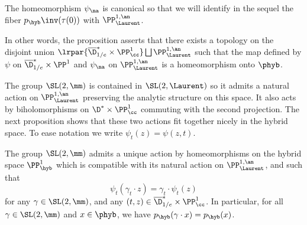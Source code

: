 The homeomorphism $\psi_\na$ is canonical so that we will identify in the sequel the fiber $p_{\hyb}\inv(\tau(0))$ with $\PP^{1,\an}_{\Laurent}$.

\begin{rema}
In other words, the proposition asserts that there exists a topology on the disjoint union $\lrpar{\overline{\D}^*_{1/e} \times \PP^1_\cc } \bigsqcup \PP^{1,\an}_{\Laurent}$ such that the map defined by $\psi$ on $\overline{\D}^*_{1/e} \times \PP^1 $ and $\psi_\na$ on $\PP^{1,\an}_{\Laurent}$ is a homeomorphism onto $\phyb$.
\end{rema}

The group $\SL(2,\mm)$ is contained in $\SL(2,\Laurent)$ so it admits a natural action on $\PP^{1,\an}_{\Laurent}$ preserving the analytic structure on this space. It also acts by biholomorphisms on $ \D^*\times \PP^1_\cc $ commuting with the second projection. The next proposition shows that these two actions fit together nicely in the hybrid space. To ease notation we write $\psi_t(z) = \psi(z,t)$.

\begin{prop}\label{prop:action hybrid}
The group $\SL(2,\mm)$ admits a unique action by homeomorphisms on the hybrid space $\PP^1_{\hyb}$ which is compatible with its natural action on $\PP^{1,\an}_{\Laurent}$, and such that
\begin{equation}\label{eq:321}
\psi_t (\gamma_t \cdot z) = \gamma_t \cdot \psi_t(z)
\end{equation}
for any $\gamma\in \SL(2,\mm)$, and any $(t,z)\in \overline{\D}^*_{1/e} \times\PP^1_\cc $. In particular, for all $\gamma\in \SL(2,\mm)$ and $x\in \phyb$, we have $p_{\hyb} (\gamma \cdot x) = p_{\hyb} (x)$.
\end{prop}

